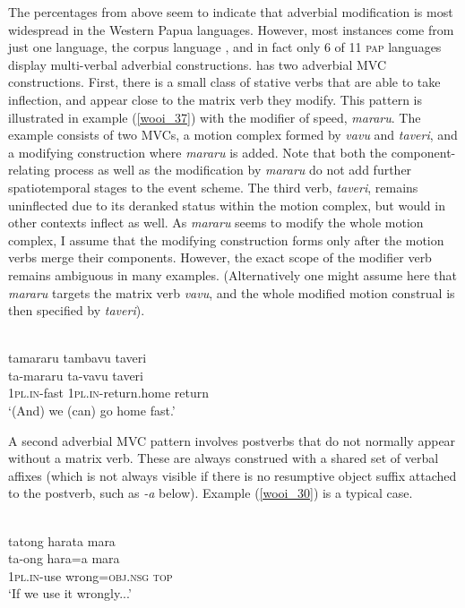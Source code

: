 The percentages from  above seem to indicate that adverbial modification is most widespread in the Western Papua languages. However, most instances come from just one language, the corpus language , and in fact only 6 of 11 \textsc{pap} languages display multi-verbal adverbial constructions.  has two adverbial MVC constructions. First, there is a small class of stative verbs that are able to take inflection, and appear close to the matrix verb they modify. This pattern is illustrated in example (\ref{wooi_37}) with the modifier of speed, \textit{mararu}. The example consists of two MVCs, a motion complex formed by \textit{vavu} and \textit{taveri}, and a modifying construction where \textit{mararu} is added. Note that both the component-relating process as well as the modification by \textit{mararu} do not add further spatiotemporal stages to the event scheme. The third verb, \textit{taveri}, remains uninflected due to its deranked status within the motion complex, but would in other contexts inflect as well. As \textit{mararu} seems to modify the whole motion complex, I assume that the modifying construction forms only after the motion verbs merge their components. However, the exact scope of the modifier verb remains ambiguous in many examples. (Alternatively one might assume here that \textit{mararu} targets the matrix verb \textit{vavu}, and the whole modified motion construal is then specified by \textit{taveri}).

\ea \label{wooi_37}
\\
\glll tamararu tambavu taveri \\
ta-mararu ta-vavu taveri \\
1\textsc{pl}.\textsc{in}-fast 1\textsc{pl}.\textsc{in}-return.home return \\
\glft `(And) we (can) go home fast.'\\ 
\z

A second adverbial MVC pattern involves postverbs that do not normally appear without a matrix verb. These are always construed with a shared set of verbal affixes (which is not always visible if there is no resumptive object suffix attached to the postverb, such as \textit{-a} below). Example (\ref{wooi_30}) is a typical case.

\ea \label{wooi_30}
\\
\glll tatong harata mara \\
ta-ong hara=a mara \\
1\textsc{pl}.\textsc{in}-use wrong=\textsc{obj}.\textsc{nsg} \textsc{top} \\
\glft `If we use it wrongly...'\\ 
\z

